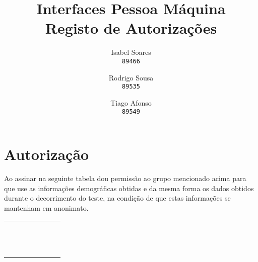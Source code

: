 \documentclass[11pt]{article}
\author{
  Isabel Soares\\
  \texttt{89466}
  \and
  Rodrigo Sousa\\
  \texttt{89535}
  \and
  Tiago Afonso\\
  \texttt{89549}
}
\title{Interfaces Pessoa Máquina\\
Registo de Autorizações}
\begin{document}
    

\maketitle

\section*{Autorização}

Ao assinar na seguinte tabela dou permissão ao grupo mencionado acima para que use as informações demográficas obtidas e da mesma forma os dados obtidos durante o decorrimento do teste, na condição de que estas informações se mantenham em anonimato.\\

    \begin{tabularx}{\textwidth}{@{\rule[-5ex]{0pt}{7ex}}|*{7}{C|}}
    \hline
    \hline
     &  &  &  \\
    \hline
     &  &  &  \\
    \hline
     &  &  &  \\
    \hline
     &  &  &  \\
    \hline
     &  &  &  \\
    \hline
     &  &  &  \\
    \hline
     &  &  &  \\
    \hline
     &  &  &  \\
    \hline
     &  &  &  \\
    \hline
     &  &  &  \\
    \hline
     &  &  &  \\
    \hline
     &  &  &  \\
    \hline
     &  &  &  \\
    \hline
    \end{tabularx}
    
\end{document}
